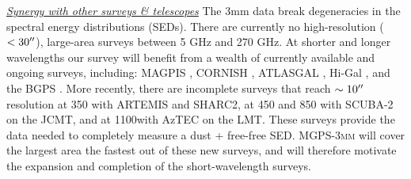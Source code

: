 \documentclass[11pt,preprint]{aastex_nofoot}
\newcommand{\MGPS}{\textsc{MGPS-3mm}\xspace}
\begin{document}









\indent\underline{\textit{ Synergy with other surveys \& telescopes}} 
The 3mm data break degeneracies in the spectral energy distributions
(SEDs). There are currently no high-resolution ($<30\mbox{$^{\prime\prime}$}$), large-area
surveys between 5 GHz and 270 GHz.  At shorter and longer wavelengths our
survey will benefit from a wealth of currently available and ongoing surveys,
including: MAGPIS \citep[1-5 GHz][]{Helfand2006a}, CORNISH \citep[5
GHz][]{Hoare2012a}, ATLASGAL \citep[870 \um][]{Schuller2009a},  Hi-Gal
\citep[70-500 \um][]{Molinari2010a}, and the BGPS
\citep[1.1 mm][]{Aguirre2011a,Ginsburg2013a}.  More recently, there are incomplete
surveys that reach $\sim10\mbox{$^{\prime\prime}$}$ resolution at 350 \um with ARTEMIS and
SHARC2, at 450 and 850 \um with SCUBA-2 on the JCMT, and at 1100\um with
AzTEC on the LMT. These surveys provide the data needed to completely
measure a dust + free-free SED.   \MGPS will cover the largest area the fastest
out of these new surveys, and will therefore motivate the expansion and
completion of the short-wavelength surveys.
\end{document}
